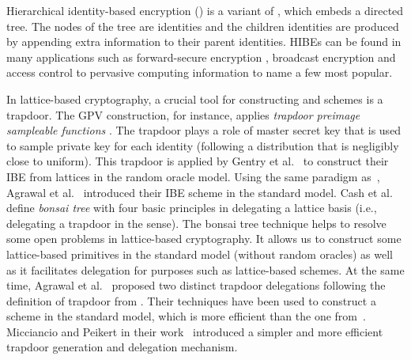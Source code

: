 \documentclass[runningheads]{llncs}
\begin{document}
 
Hierarchical identity-based encryption () \cite{HL02, GS02a} is a variant of  \cite{Sha85},
which embeds a directed tree. The nodes of the tree are identities and
the children identities are produced by appending extra information to their parent identities. 
HIBEs can be found in many applications such as
forward-secure encryption \cite{CHK03}, broadcast encryption \cite{DF03, YFDL04}
and access control to pervasive computing information \cite{HS05} to name a few most popular.
 
In lattice-based cryptography, a crucial tool for constructing  and  schemes is a trapdoor.
The GPV construction, for instance, applies \textit{trapdoor preimage sampleable functions} \cite{GPV08}.
The trapdoor plays a role of master secret key that is used to sample 
private key for each identity (following a distribution that is negligibly close to uniform).
This trapdoor is applied by Gentry et al.~\cite{GPV08} 
to construct their IBE from lattices in the random oracle model.
Using the same paradigm as~\cite{GPV08}, 
Agrawal et al.~\cite{AB09} introduced their IBE scheme in the standard model. 
Cash et al. \cite{CHKP10} define \textit{bonsai tree} with four basic principles in delegating a lattice basis 
(i.e., delegating a trapdoor in the \cite{GPV08} sense). 
The bonsai tree technique helps to resolve some open problems in lattice-based cryptography. 
It allows us to construct some lattice-based primitives in the standard model (without random oracles) 
as well as it facilitates delegation for purposes such as lattice-based 
 schemes. 
At the same time, Agrawal et al.~\cite{ABB10} proposed two distinct trapdoor delegations 
following the definition of trapdoor from \cite{GPV08}. 
Their techniques have been used to construct a  scheme in the standard model, 
which is more efficient than the one from~\cite{CHKP10}. 
Micciancio and Peikert in their work~\cite{MP12} introduced a simpler and 
more efficient trapdoor generation and delegation mechanism.
\end{document}
